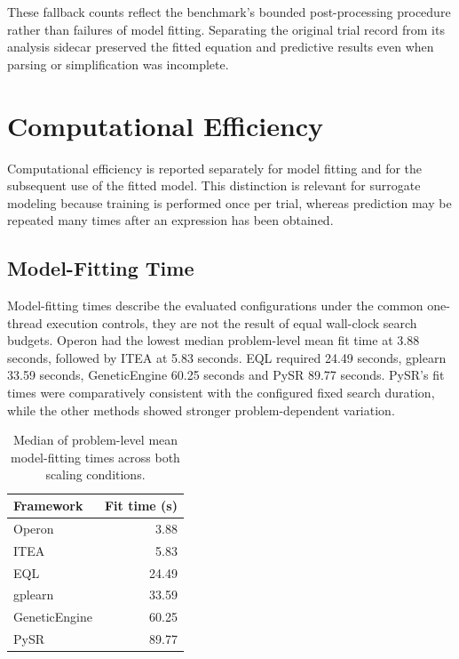 \documentclass[12pt,oneside,bibtotoc,liststotoc]{scrbook}
\begin{document}
These fallback counts reflect the benchmark's bounded post-processing procedure rather than failures of model fitting. Separating the original trial record from its analysis sidecar preserved the fitted equation and predictive results even when parsing or simplification was incomplete.

\section{Computational Efficiency}

Computational efficiency is reported separately for model fitting and for the subsequent use of the fitted model. This distinction is relevant for surrogate modeling because training is performed once per trial, whereas prediction may be repeated many times after an expression has been obtained.

\subsection{Model-Fitting Time}

Model-fitting times describe the evaluated configurations under the common one-thread execution controls, they are not the result of equal wall-clock search budgets. Operon had the lowest median problem-level mean fit time at 3.88 seconds, followed by ITEA at 5.83 seconds. EQL required 24.49 seconds, gplearn 33.59 seconds, GeneticEngine 60.25 seconds and PySR 89.77 seconds. PySR's fit times were comparatively consistent with the configured fixed search duration, while the other methods showed stronger problem-dependent variation.

\begin{table}[H]
    \centering
    \caption{Median of problem-level mean model-fitting times across both scaling conditions.}
    \label{tab:results-fit-time-summary}
    \begin{tabular}{lr}
        \toprule
        Framework & Fit time (s) \\
        \midrule
        Operon & 3.88 \\
        ITEA & 5.83 \\
        EQL & 24.49 \\
        gplearn & 33.59 \\
        GeneticEngine & 60.25 \\
        PySR & 89.77 \\
        \bottomrule
    \end{tabular}
\end{table}
\end{document}

